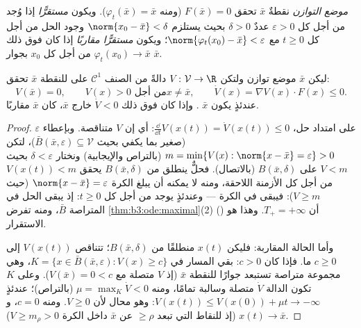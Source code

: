 \begin{definition}\label{def:b3:ode:stability}
\emph{موضع التوازن} نقطةٌ $\bar x$ تحقق $F(\bar x) =
0$ (ومنه $\varphi_t(\bar x) = \bar x$).
ويكون \emph{مستقرًّا} إذا وُجد من أجل
كل $\varepsilon > 0$ عددٌ $\delta > 0$ بحيث يستلزم $\norm{x_0 - \bar x} < \delta$ وجود الحل من
أجل كل $t \geq 0$ مع $\norm{\varphi_t(x_0) - \bar
x} < \varepsilon$؛ ويكون \emph{مستقرًّا مقاربًا} إذا
كان فوق ذلك $\varphi_t(x_0) \to \bar x$ من أجل كل $x_0$ بجوار $\bar x$.
\end{definition}

\begin{theorem}\label{thm:b3:ode:lyapunov}
ليكن $\bar x$ موضع توازن ولتكن $V \colon \mathcal V \to
\R$ دالةً من الصنف
$\mathcal C^1$ على  للنقطة $\bar x$
تحقق:
\[
V(\bar x) = 0,\qquad V(x) > 0 \text{ من أجل} x \neq \bar x,
\qquad \dot V(x) = \nabla V(x)\cdot F(x) \leq 0 .
\]
عندئذٍ يكون $\bar x$ . وإذا كان فوق ذلك $\dot V < 0$
خارج $\bar
x$، كان $\bar x$  مقاربًا.
\end{theorem}

\begin{proof}
على امتداد حل، $\frac{\dd}{\dd t}V(x(t)) = \dot V(x(t))
\leq 0$: أي إن $V$ متناقصة. وبإعطاء $\varepsilon$
(صغير بما يكفي بحيث $\bar B(\bar x, \varepsilon) \subseteq \mathcal V$)، لتكن
$m = \min\{V(x) : \norm{x - \bar x} = \varepsilon\} > 0$
(بالتراص والإيجابية) ونختار $\delta < \varepsilon$ بحيث $V < m$ على $B(\bar x, \delta)$
(بالاتصال). فحلٌّ ينطلق من $B(\bar x, \delta)$ يحقق $V(x(t)) < m$ من أجل كل
الأزمنة اللاحقة، ومنه لا يمكنه أن يبلغ الكرة $\norm{x -
\bar x} = \varepsilon$ (حيث
$V \geq m$): فيبقى في الكرة --- وعندئذٍ يوجد من أجل كل
$t \geq 0$: إذ يبقى الحل في المتراصة $\bar B$، ومنه تفرض
\cref{thm:b3:ode:maximal}(2) () أن $T_+ = +\infty$. وهذا
هو الاستقرار.

وأما الحالة المقاربة: فليكن $x(t)$ منطلقًا من $B(\bar x, \delta)$؛ تتناقص
$V(x(t))$ إلى $c \geq 0$ ما. فإذا كان $c > 0$: بقي المسار في
$K = \{x \in \bar B(\bar x,
\varepsilon): V(x) \geq c\}$، وهي مجموعة متراصة تستبعد جوارًا للنقطة $\bar x$ (إذ
$V$ متصلة مع $V(\bar x)
= 0 < c$). وعلى $K$ تكون الدالة $\dot V$ متصلة
وسالبة تمامًا، ومنه $\mu = \max_K\dot V < 0$ (بالتراص)؛ عندئذٍ $V(x(t)) \leq V(x(0)) + \mu t \to
-\infty$: وهو محال
لأن $V \geq 0$. ومنه $c = 0$، و $x(t) \to \bar x$ (إذ للنقاط التي تبعد
$\geq
\rho$ عن $\bar x$ داخل الكرة $V \geq m_\rho >
0$).
\end{proof}

